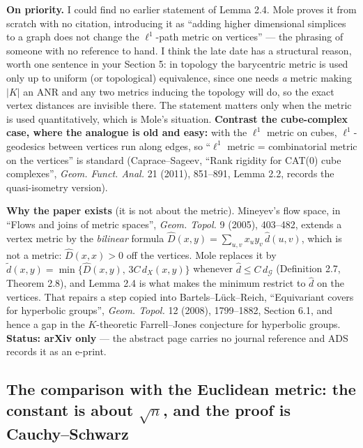 \documentclass[
]{article}
\begin{document}
\textbf{On priority.} I could find no earlier statement of Lemma 2.4.
Mole proves it from scratch with no citation, introducing it as ``adding
higher dimensional simplices to a graph does not change the
\(\ell^1\)-path metric on vertices'' --- the phrasing of someone with no
reference to hand. I think the late date has a structural reason, worth
one sentence in your Section 5: in topology the barycentric metric is
used only up to uniform (or topological) equivalence, since one needs
\emph{a} metric making \(|K|\) an ANR and any two metrics inducing the
topology will do, so the exact vertex distances are invisible there. The
statement matters only when the metric is used quantitatively, which is
Mole's situation. \textbf{Contrast the cube-complex case, where the
analogue is old and easy:} with the \(\ell^1\) metric on cubes,
\(\ell^1\)-geodesics between vertices run along edges, so ``\(\ell^1\)
metric = combinatorial metric on the vertices'' is standard
(Caprace--Sageev, ``Rank rigidity for CAT(0) cube complexes'',
\emph{Geom. Funct. Anal.} 21 (2011), 851--891, Lemma 2.2, records the
quasi-isometry version).

\textbf{Why the paper exists} (it is not about the metric). Mineyev's
flow space, in ``Flows and joins of metric spaces'', \emph{Geom. Topol.}
9 (2005), 403--482, extends a vertex metric by the \emph{bilinear}
formula \(\widehat D(x,y)=\sum_{u,v}x_uy_v\,\hat d(u,v)\), which is not
a metric: \(\widehat D(x,x)>0\) off the vertices. Mole replaces it by
\(\tilde d(x,y)=\min\{\widehat D(x,y),\,3C\,d_X(x,y)\}\) whenever
\(\hat d\le C\,d_{\mathcal G}\) (Definition 2.7, Theorem 2.8), and Lemma
2.4 is what makes the minimum restrict to \(\hat d\) on the vertices.
That repairs a step copied into Bartels--L\"{u}ck--Reich, ``Equivariant
covers for hyperbolic groups'', \emph{Geom. Topol.} 12 (2008),
1799--1882, Section 6.1, and hence a gap in the \(K\)-theoretic
Farrell--Jones conjecture for hyperbolic groups. \textbf{Status: arXiv
only} --- the abstract page carries no journal reference and ADS records
it as an e-print.

\subsection{\texorpdfstring{The comparison with the Euclidean metric:
the constant is about \(\sqrt n\), and the proof is
Cauchy--Schwarz}{The comparison with the Euclidean metric: the constant is about \textbackslash sqrt n, and the proof is Cauchy--Schwarz}}\label{the-comparison-with-the-euclidean-metric-the-constant-is-about-sqrt-n-and-the-proof-is-cauchyschwarz}
\end{document}
